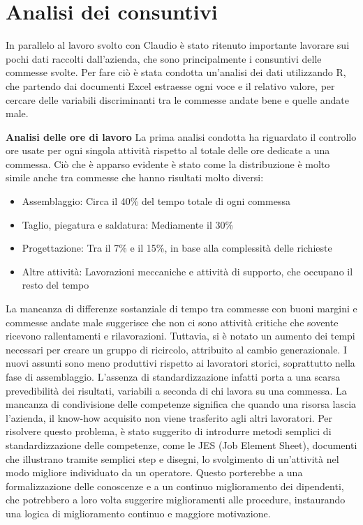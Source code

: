 \section{Analisi dei consuntivi}
\begin{multicols}{2}
	In parallelo al lavoro svolto con Claudio è stato ritenuto importante lavorare sui pochi dati raccolti dall’azienda, che sono principalmente i consuntivi delle commesse svolte. Per fare ciò è stata condotta un’analisi dei dati utilizzando R, che partendo dai documenti Excel estraesse ogni voce e il relativo valore, per cercare delle variabili discriminanti tra le commesse andate bene e quelle andate male.

	\textbf{Analisi delle ore di lavoro}\newline
	La prima analisi condotta ha riguardato il controllo ore usate per ogni singola attività rispetto al totale delle ore dedicate a una commessa. Ciò che è apparso evidente è stato come la distribuzione è molto simile anche tra commesse che hanno risultati molto diversi:
	\begin{itemize}
		\item Assemblaggio: Circa il 40\% del tempo totale di ogni commessa
		\item Taglio, piegatura e saldatura: Mediamente il 30\%
		\item Progettazione: Tra il 7\% e il 15\%, in base alla complessità delle richieste
		\item Altre attività: Lavorazioni meccaniche e attività di supporto, che occupano il resto del tempo
	\end{itemize}

	La mancanza di differenze sostanziale di tempo tra commesse con buoni margini e commesse andate male suggerisce che non ci sono attività critiche che sovente ricevono rallentamenti e rilavorazioni.
	Tuttavia, si è notato un aumento dei tempi necessari per creare un gruppo di ricircolo, attribuito al cambio generazionale. I nuovi assunti sono meno produttivi rispetto ai lavoratori storici, soprattutto nella fase di assemblaggio. L’assenza di standardizzazione infatti porta a una scarsa prevedibilità dei risultati, variabili a seconda di chi lavora su una commessa.
	La mancanza di condivisione delle competenze significa che quando una risorsa lascia l’azienda, il know-how acquisito non viene trasferito agli altri lavoratori.
	Per risolvere questo problema, è stato suggerito di introdurre metodi semplici di standardizzazione delle competenze, come le JES (Job Element Sheet), documenti che illustrano tramite semplici step e disegni, lo svolgimento di un’attività nel modo migliore individuato da un operatore. Questo porterebbe a una formalizzazione delle conoscenze e a un continuo miglioramento dei dipendenti, che potrebbero a loro volta suggerire miglioramenti alle procedure, instaurando una logica di miglioramento continuo e maggiore motivazione.


\end{multicols}
